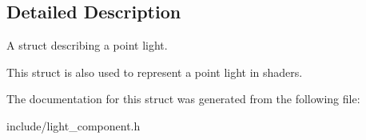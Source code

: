 \subsection{Detailed Description}
A struct describing a point light. 

This struct is also used to represent a point light in shaders. 

The documentation for this struct was generated from the following file\+:\begin{DoxyCompactItemize}
\item 
include/light\+\_\+component.\+h\end{DoxyCompactItemize}
